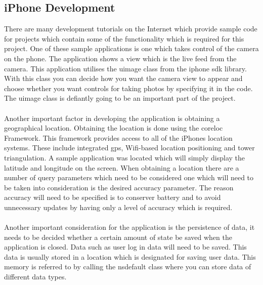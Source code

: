 \documentclass[12pt]{article}
\begin{document}

\subsection{iPhone Development}
There are many development tutorials on the Internet which provide sample code for projects which contain some of the functionality which is required for this project. One of these sample applications is one which takes control of the camera on the phone. The application shows a view which is the live feed from the camera. This application utilises the \gls{uimage} class from the \gls{iphone} \gls{sdk} library. With this class you can decide how you want the camera view to appear and choose whether you want controls for taking photos by specifying it in the code. The \gls{uimage} class is defiantly going to be an important part of the project.



\paragraph{}
\label{par:First Paragraph}

Another important factor in developing the application is obtaining a geographical location. Obtaining the location is done using the \gls{coreloc} Framework. This framework provides access to all of the iPhones location systems. These include integrated \gls{gps}, Wifi-based location positioning and tower triangulation.
A sample application was located which will simply display the latitude and longitude on the screen. When obtaining a location there are a number of query parameters which need to be considered one which will need to be taken into consideration is the desired accuracy parameter. The reason accuracy will need to be specified is to conserver battery and to avoid unnecessary updates by having only a level of accuracy which is required.

\paragraph{}
\label{par:First Paragraph}

Another important consideration for the application is the persistence of data, it needs to be decided whether a certain amount of state be saved when the application is closed. Data such as user log in data will need to be saved. This data is usually stored in a location which is designated for saving user data. This memory is referred to by calling the \gls{nsdefault} class where you can store data of different data types.
\end{document}
